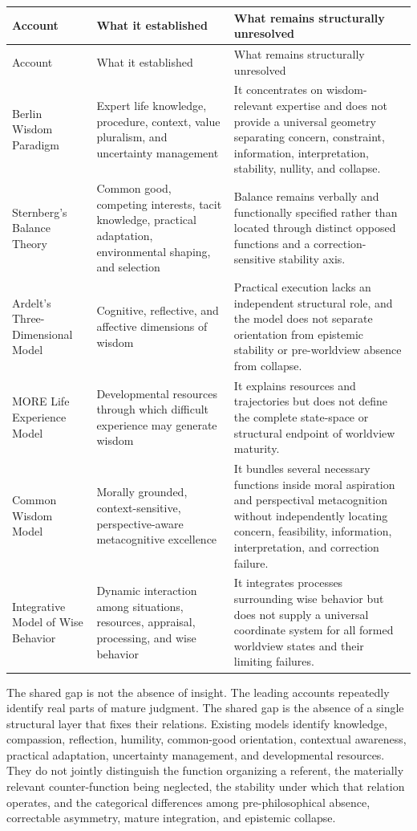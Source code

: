 \documentclass[11pt]{article}
\begin{document}
\begin{longtable}{>{\raggedright\arraybackslash}p{3.0cm} >{\raggedright\arraybackslash}p{4.5cm} >{\raggedright\arraybackslash}p{6.0cm}}
\toprule
Account & What it established & What remains structurally unresolved \\
\midrule
\endfirsthead
\toprule
Account & What it established & What remains structurally unresolved \\
\midrule
\endhead
Berlin Wisdom Paradigm & Expert life knowledge, procedure, context, value pluralism, and uncertainty management & It concentrates on wisdom-relevant expertise and does not provide a universal geometry separating concern, constraint, information, interpretation, stability, nullity, and collapse. \\
Sternberg's Balance Theory & Common good, competing interests, tacit knowledge, practical adaptation, environmental shaping, and selection & Balance remains verbally and functionally specified rather than located through distinct opposed functions and a correction-sensitive stability axis. \\
Ardelt's Three-Dimensional Model & Cognitive, reflective, and affective dimensions of wisdom & Practical execution lacks an independent structural role, and the model does not separate orientation from epistemic stability or pre-worldview absence from collapse. \\
MORE Life Experience Model & Developmental resources through which difficult experience may generate wisdom & It explains resources and trajectories but does not define the complete state-space or structural endpoint of worldview maturity. \\
Common Wisdom Model & Morally grounded, context-sensitive, perspective-aware metacognitive excellence & It bundles several necessary functions inside moral aspiration and perspectival metacognition without independently locating concern, feasibility, information, interpretation, and correction failure. \\
Integrative Model of Wise Behavior & Dynamic interaction among situations, resources, appraisal, processing, and wise behavior & It integrates processes surrounding wise behavior but does not supply a universal coordinate system for all formed worldview states and their limiting failures. \\
\bottomrule
\end{longtable}

The shared gap is not the absence of insight. The leading accounts repeatedly identify real parts of mature judgment. The shared gap is the absence of a single structural layer that fixes their relations. Existing models identify knowledge, compassion, reflection, humility, common-good orientation, contextual awareness, practical adaptation, uncertainty management, and developmental resources. They do not jointly distinguish the function organizing a referent, the materially relevant counter-function being neglected, the stability under which that relation operates, and the categorical differences among pre-philosophical absence, correctable asymmetry, mature integration, and epistemic collapse.
\end{document}
